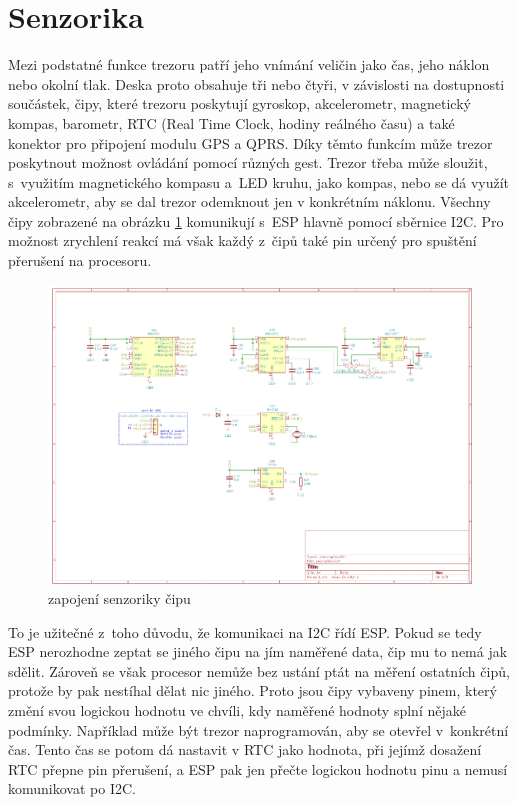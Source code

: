 \section{Senzorika}
Mezi podstatné funkce trezoru patří jeho vnímání veličin jako čas, jeho náklon nebo okolní tlak.
Deska proto obsahuje tři nebo čtyři, v závislosti na dostupnosti součástek, čipy, které trezoru poskytují gyroskop, akcelerometr, magnetický kompas,
barometr, RTC (Real Time Clock, hodiny reálného času) a také konektor pro připojení modulu GPS a QPRS. Díky těmto funkcím může trezor poskytnout možnost ovládání pomocí různých gest. 
Trezor třeba může sloužit, s~využitím magnetického kompasu a~LED kruhu, jako kompas, nebo se dá využít akcelerometr, 
aby se dal trezor odemknout jen v konkrétním náklonu. Všechny čipy zobrazené na obrázku \ref{fig:E4-sch_vnimani} komunikují s~ESP hlavně pomocí 
sběrnice I2C. Pro možnost zrychlení reakcí má však každý z~čipů také pin určený pro spuštění přerušení na procesoru. 

\begin{figure}[htbp] %
    \centering
    \includegraphics[width=\textwidth]{kapitoly/obrazky/E4/vnimani/sch.png}
    \caption{zapojení senzoriky čipu}
    \label{fig:E4-sch_vnimani}
\end{figure}

\newpage

To je užitečné z~toho důvodu, že komunikaci na I2C řídí ESP. Pokud se tedy ESP nerozhodne zeptat se jiného čipu na jím naměřené data, čip mu to nemá 
jak sdělit. Zároveň se však procesor nemůže bez ustání ptát na měření ostatních čipů, protože by pak nestíhal dělat nic jiného. Proto jsou čipy vybaveny 
pinem, který změní svou logickou hodnotu ve chvíli, kdy naměřené hodnoty splní nějaké podmínky. 
Například může být trezor naprogramován, aby se otevřel 
v~konkrétní čas. Tento čas se potom dá nastavit v RTC jako hodnota, při jejímž dosažení RTC přepne pin přerušení, a ESP pak jen přečte logickou hodnotu 
pinu a nemusí komunikovat po I2C. %

